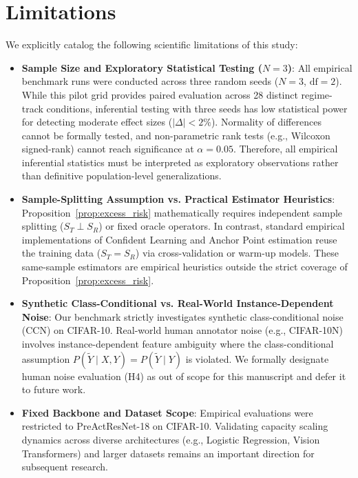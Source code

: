 \documentclass[10pt,twocolumn]{article}
\theoremstyle{definition}
\begin{document}
\section{Limitations}
We explicitly catalog the following scientific limitations of this study:
\begin{itemize}
    \item \textbf{Sample Size and Exploratory Statistical Testing ($N=3$)}: All empirical benchmark runs were conducted across three random seeds ($N=3$, $\text{df}=2$). While this pilot grid provides paired evaluation across 28 distinct regime-track conditions, inferential testing with three seeds has low statistical power for detecting moderate effect sizes ($|\Delta| < 2\%$). Normality of differences cannot be formally tested, and non-parametric rank tests (e.g., Wilcoxon signed-rank) cannot reach significance at $\alpha=0.05$. Therefore, all empirical inferential statistics must be interpreted as exploratory observations rather than definitive population-level generalizations.
    \item \textbf{Sample-Splitting Assumption vs. Practical Estimator Heuristics}: Proposition~\ref{prop:excess_risk} mathematically requires independent sample splitting ($S_T \perp S_R$) or fixed oracle operators. In contrast, standard empirical implementations of Confident Learning and Anchor Point estimation reuse the training data ($S_T = S_R$) via cross-validation or warm-up models. These same-sample estimators are empirical heuristics outside the strict coverage of Proposition~\ref{prop:excess_risk}.
    \item \textbf{Synthetic Class-Conditional vs. Real-World Instance-Dependent Noise}: Our benchmark strictly investigates synthetic class-conditional noise (CCN) on CIFAR-10. Real-world human annotator noise (e.g., CIFAR-10N) involves instance-dependent feature ambiguity where the class-conditional assumption $P(\tilde{Y} \mid X, Y) = P(\tilde{Y} \mid Y)$ is violated. We formally designate human noise evaluation (H4) as out of scope for this manuscript and defer it to future work.
    \item \textbf{Fixed Backbone and Dataset Scope}: Empirical evaluations were restricted to PreActResNet-18 on CIFAR-10. Validating capacity scaling dynamics across diverse architectures (e.g., Logistic Regression, Vision Transformers) and larger datasets remains an important direction for subsequent research.
\end{itemize}
\end{document}
